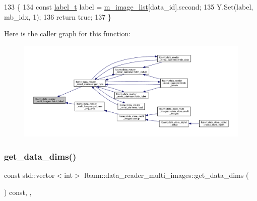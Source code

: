 \begin{DoxyCode}
133                                                                                    \{
134   \textcolor{keyword}{const} \hyperlink{classlbann_1_1image__data__reader_a7645f17852c990e80b1530509ff5e87c}{label\_t} label = \hyperlink{classlbann_1_1data__reader__multi__images_a6d8e2d161c9efff1ac70f847b4a7e9d0}{m\_image\_list}[data\_id].second;
135   Y.Set(label, mb\_idx, 1);
136   \textcolor{keywordflow}{return} \textcolor{keyword}{true};
137 \}
\end{DoxyCode}
Here is the caller graph for this function\+:\nopagebreak
\begin{figure}[H]
\begin{center}
\leavevmode
\includegraphics[width=350pt]{classlbann_1_1data__reader__multi__images_a96baf61a6207a76060afeaa31b55b671_icgraph}
\end{center}
\end{figure}
\mbox{\label{classlbann_1_1data__reader__multi__images_aca93e0ab0edf13397de414d41aff1cd1}} 
\subsubsection{\texorpdfstring{get\+\_\+data\+\_\+dims()}{get\_data\_dims()}}
{\footnotesize\ttfamily const std\+::vector$<$int$>$ lbann\+::data\+\_\+reader\+\_\+multi\+\_\+images\+::get\+\_\+data\+\_\+dims (\begin{DoxyParamCaption}{ }\end{DoxyParamCaption}) const\hspace{0.3cm}{\ttfamily [inline]}, {\ttfamily [override]}, {\ttfamily [virtual]}}



